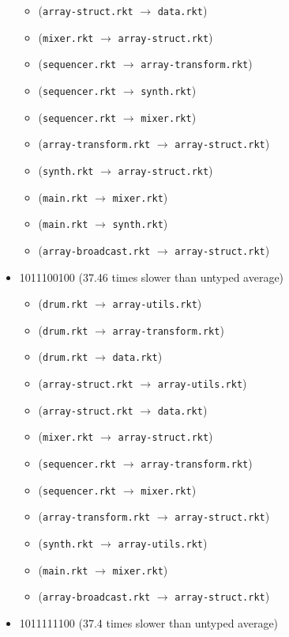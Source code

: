 \documentclass{article}
\newcommand{\mono}[1]{\texttt{#1}}
\begin{document}
\begin{itemize}
\begin{itemize}
  \item (\mono{array-struct.rkt} $\rightarrow$ \mono{data.rkt})
  \item (\mono{mixer.rkt} $\rightarrow$ \mono{array-struct.rkt})
  \item (\mono{sequencer.rkt} $\rightarrow$ \mono{array-transform.rkt})
  \item (\mono{sequencer.rkt} $\rightarrow$ \mono{synth.rkt})
  \item (\mono{sequencer.rkt} $\rightarrow$ \mono{mixer.rkt})
  \item (\mono{array-transform.rkt} $\rightarrow$ \mono{array-struct.rkt})
  \item (\mono{synth.rkt} $\rightarrow$ \mono{array-struct.rkt})
  \item (\mono{main.rkt} $\rightarrow$ \mono{mixer.rkt})
  \item (\mono{main.rkt} $\rightarrow$ \mono{synth.rkt})
  \item (\mono{array-broadcast.rkt} $\rightarrow$ \mono{array-struct.rkt})
  \end{itemize}
\item 1011100100 (37.46 times slower than untyped average)
  \begin{itemize}
  \item (\mono{drum.rkt} $\rightarrow$ \mono{array-utils.rkt})
  \item (\mono{drum.rkt} $\rightarrow$ \mono{array-transform.rkt})
  \item (\mono{drum.rkt} $\rightarrow$ \mono{data.rkt})
  \item (\mono{array-struct.rkt} $\rightarrow$ \mono{array-utils.rkt})
  \item (\mono{array-struct.rkt} $\rightarrow$ \mono{data.rkt})
  \item (\mono{mixer.rkt} $\rightarrow$ \mono{array-struct.rkt})
  \item (\mono{sequencer.rkt} $\rightarrow$ \mono{array-transform.rkt})
  \item (\mono{sequencer.rkt} $\rightarrow$ \mono{mixer.rkt})
  \item (\mono{array-transform.rkt} $\rightarrow$ \mono{array-struct.rkt})
  \item (\mono{synth.rkt} $\rightarrow$ \mono{array-utils.rkt})
  \item (\mono{main.rkt} $\rightarrow$ \mono{mixer.rkt})
  \item (\mono{array-broadcast.rkt} $\rightarrow$ \mono{array-struct.rkt})
  \end{itemize}
\item 1011111100 (37.4 times slower than untyped average)

\end{itemize}
\end{document}
